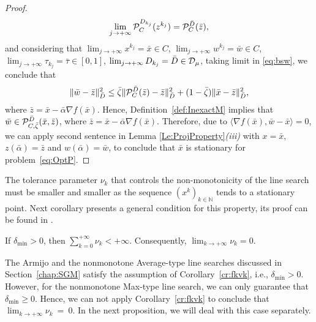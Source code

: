 \begin{proof}
	$$
		\lim_{j \to +\infty}{\cal P}_{C}^{D_{k_j}}(z^{k_j})= {\cal P}_{C}^{\bar D}(\bar{z}),
	$$
	and considering that $\lim_{j\to +\infty} x^{k_j} = \bar{x}\in C$, $\lim_{j\to +\infty} w^{k_j} = \bar{w}\in C$, $\lim_{j \to +\infty} \tau_{k_j} = \bar{\tau} \in [0,1]$,   $\lim_{j \to +\infty} D_{k_j} = \bar{D}\in {\cal D}_{\mu}$, taking limit in \eqref{eq:bsw},  we conclude that
	$$
		\|\bar{w} -\bar{z}\|_{\bar D}^2\leq  {\bar \zeta}  \| {\cal P}_{C}^{\bar D}(\bar{z})-\bar{z}\|_{\bar D}^2+(1- {\bar \zeta} )\| \bar{x}-\bar{z}\|_{\bar D}^2 ,
	$$
	where $\bar{z} = \bar{x}-{\bar \alpha} \nabla f(\bar{x})$. Hence, Definition~\ref{def:InexactM} implies  that ${\bar w}\in  {\cal P}_{C,{\bar \zeta}}^{\bar D}( {\bar x}, {\bar z})$, where $\bar{z} = \bar{x}-{\bar \alpha} \nabla f(\bar{x})$. Therefore, due to $\langle \nabla f(\bar{x}), \bar{w}-\bar{x} \rangle = 0$, we can apply second sentence in Lemma \ref{Le:ProjProperty}{\it (iii)} with $x = \bar{x}$, $z({\bar \alpha}) = \bar{z}$ and $w({\bar \alpha}) = \bar{w}$, to conclude that $\bar{x}$ is stationary for problem~\eqref{eq:OptP}.
\end{proof}



The tolerance parameter $\nu_{k}$ that controls the non-monotonicity of the line search must be smaller and smaller as the sequence $(x^k)_{k\in\mathbb{N}}$  tends to  a stationary point. Next corollary presents a general condition for this property, its proof can be found in \cite[Theorem 4]{GrapigliaSachs2017}.
\begin{corollary} \label{cr:fkvk}
	If $\delta_{\min}>0$,  then  $\sum_{k=0}^{+\infty} \nu_k<+\infty$. Consequently, $\lim_{k\to +\infty} \nu_{k} = 0$.
\end{corollary}

The Armijo and the nonmonotone Average-type line searches discussed in Section~\ref{chap:SGM} satisfy  the assumption of Corollary~\ref{cr:fkvk}, i.e., $\delta_{\min}>0$.  However,    for  the  nonmonotone Max-type line search,  we   can only guarantee that $\delta_{\min}\geq 0$. Hence,  we can not apply  Corollary~\ref{cr:fkvk}  to conclude that $\lim_{k\to +\infty} \nu_{k}~=~0$.  In the next proposition, we will deal with this case separately.

